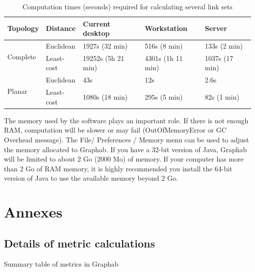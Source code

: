 \documentclass{article}
\begin{document}
\begin{table}[H]
\begin{tabular}{|l|l|l|l|l|}
\hline
Topology & Distance & Current desktop & Workstation  & Server\\
\hline
\multirow{2}{*}{Complete}
 & Euclidean & 1927s (32 min) & 516s (8 min) & 133s (2 min)\\
\hhline{~----}
 & Least-cost & 19252s (5h 21 min) & 4301s (1h 11 min) & 1037s (17 min)\\
\hline
\multirow{2}{*}{Planar}
 & Euclidean & 43s & 12s & 2.6s\\
\hhline{~----}
 & Least-cost & 1080s (18 min) & 295s (5 min) & 82s (1 min)\\
\hline
\end{tabular}
\caption{Computation times (seconds) required for calculating several link sets}
\label{perf}
\end{table}

The memory used by the software plays an important role. If there is not enough RAM, computation will be slower or may fail (OutOfMemoryError or GC Overhead message). The File/ Preferences / Memory menu can be used to adjust the memory allocated to Graphab. If you have a 32-bit version of Java, Graphab will be limited to about 2 Go (2000 Mo) of memory. If your computer has more than 2 Go of RAM memory, it is highly
recommended you install the 64-bit version of Java to use the available memory beyond 2 Go.


\section{Annexes}

\subsection{Details of metric calculations}

Summary table of metrics in Graphab
\end{document}
